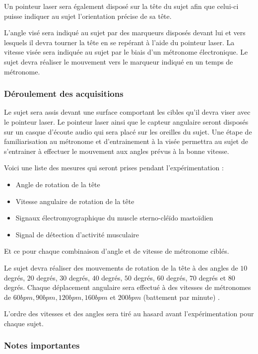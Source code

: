 \documentclass[letterpaper, twoside, 12pt, memoire, creativecommons, hyperref]{thETS}
\begin{document}
Un pointeur laser sera également disposé sur la tête du sujet afin que celui-ci puisse indiquer au sujet l’orientation précise de sa tête.
 
L’angle visé sera indiqué au sujet par des marqueurs disposés devant lui et vers lesquels il devra tourner la tête en se repérant à l’aide du pointeur laser. La vitesse visée sera indiquée au sujet par le biais d’un métronome électronique. Le sujet devra réaliser le mouvement vers le marqueur indiqué en un temps de métronome. 

\subsubsection{Déroulement des acquisitions}

Le sujet sera assis devant une surface comportant les cibles qu’il devra viser avec le pointeur laser. Le pointeur laser ainsi que le capteur angulaire seront disposés sur un casque d’écoute audio qui sera placé sur les oreilles du sujet.
Une étape de familiarisation au métronome et d’entrainement à la visée permettra au sujet de s’entrainer à effectuer le mouvement aux angles prévus à la bonne vitesse.

Voici une liste des mesures qui seront prises pendant l’expérimentation : 

\begin{itemize}
 \item Angle de rotation de la tête 
 \item Vitesse angulaire de rotation de la tête 
 \item Signaux électromyographique du muscle sterno-cléïdo mastoïdien
 \item Signal de détection d’activité musculaire
\end{itemize}

Et ce pour chaque combinaison d’angle et de vitesse de métronome ciblés.

Le sujet devra réaliser des mouvements de rotation de la tête à des angles de $10$ degrés, $20$ degrés, $30$ degrés, $40$ degrés, $50$ degrés, $60$ degrés, $70$ degrés et $80$ degrés. Chaque déplacement angulaire sera effectué à des vitesses de métronomes de $60 bpm, 90 bpm, 120 bpm, 160 bpm$ et $200 bpm$ (battement par minute) . 

L’ordre des vitesses et des angles sera tiré au hasard avant l’expérimentation pour chaque sujet.

\subsubsection{Notes importantes}
\end{document}

